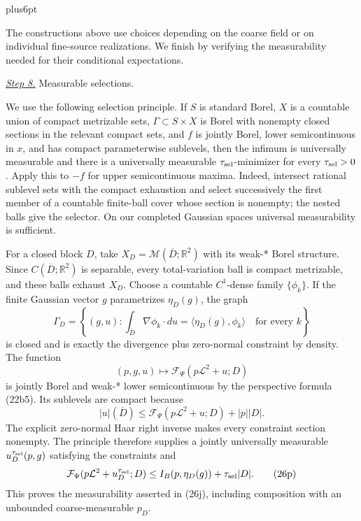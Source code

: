 \documentclass[11pt,reqno]{amsart}
\makeatletter
\theoremstyle{plain}
\theoremstyle{definition}
\theoremstyle{remark}
\renewenvironment{proof}[1][\proofname]{%
  \par
  \pushQED{\qed}%
  \normalfont
  \topsep6pt plus6pt\relax
  \trivlist
  \item[\hskip\labelsep\slshape #1\@addpunct{.}]%
  \ignorespaces
}{%
  \popQED
  \endtrivlist
  \@endpefalse
}
\DeclareRobustCommand{\qed}{%
  \leavevmode\unskip\penalty9999\hbox{}\nobreak
  \ifmmode
    \makebox[0pt][l]{\qquad\hbox{\qedsymbol}}%
  \else
    \qquad\hbox{\qedsymbol}%
  \fi
}
\renewcommand{\qedsymbol}{\rule[.47pt]{4pt}{6pt}}
\numberwithin{equation}{section}
\newcommand{\1}{\mathbf 1}
\makeatother
\begin{document}
\begin{proof}
The constructions above use choices depending on the coarse field or
on individual fine-source realizations.  We finish by verifying the
measurability needed for their conditional expectations.

\smallskip\noindent
\underline{\textit{Step 8.}} Measurable selections.

We use the following selection principle.  If $S$ is standard Borel, $X$ is a
countable union of compact metrizable sets, $\Gamma\subset S\times X$
is Borel with nonempty closed sections in the relevant compact sets, and
$f$ is jointly Borel, lower semicontinuous in $x$, and has compact
parameterwise sublevels, then the infimum is universally measurable and
there is a universally measurable $\tau_{\rm sel}$-minimizer for every
$\tau_{\rm sel}>0$.  Apply this to $-f$ for upper semicontinuous maxima.
Indeed, intersect rational sublevel sets with the compact exhaustion and
select successively the first member of a countable finite-ball cover
whose section is nonempty; the nested balls give the selector.  On our
completed Gaussian spaces universal measurability is sufficient.

For a closed block $D$, take
$X_ D=\mathcal M(\overline D;\mathbb R^2)$ with its weak-* Borel
structure.  Since $C(\overline D;\mathbb R^2)$ is separable, every
total-variation ball is compact metrizable, and these balls exhaust
$X_ D$.  Choose a countable $C^1$-dense family $\{\phi_ k\}$.  If
the finite Gaussian vector $g$ parametrizes $\eta_ D(g)$, the graph
\begin{equation}
\Gamma_ D=\left\{(g,u):
\int_ {\overline D}\nabla\phi_ k\cdot du
=\langle\eta_ D(g),\phi_ k\rangle\quad\text{for every }k\right\}
\tag{26m}
\end{equation}
is closed and is exactly the divergence plus zero-normal constraint by
density.  The function
\begin{equation}
(p,g,u)\longmapsto\mathcal F_ \Psi(p\mathcal L^2+u;D)
\tag{26n}
\end{equation}
is jointly Borel and weak-* lower semicontinuous by the perspective
formula (22b5).  Its sublevels are compact because
\begin{equation}
|u|(\overline D)\leq
\mathcal F_ \Psi(p\mathcal L^2+u;D)+|p||D|.
\tag{26o}
\end{equation}
The explicit zero-normal Haar right inverse makes every constraint
section nonempty.  The principle therefore supplies a jointly
universally measurable $u_ D^{\tau_{\rm sel}}(p,g)$ satisfying the constraints
and
\begin{equation}
\mathcal F_ \Psi(p\mathcal L^2+u_ D^{\tau_{\rm sel}};D)
\leq I_ B(p,\eta_ D(g))+\tau_{\rm sel}|D|.
\tag{26p}
\end{equation}
This proves the measurability asserted in (26j), including composition
with an unbounded coarse-measurable $p_ D$.


\end{proof}
\end{document}
